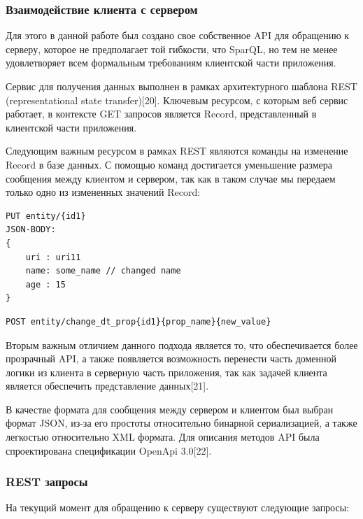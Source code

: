 \documentclass[12pt]{article}
\begin{document}
\subsubsection{Взаимодействие клиента с сервером}
\qquad Для этого в данной работе был создано свое собственное API для обращению к серверу, которое не предполагает той гибкости, что SparQL, но тем не менее удовлетворяет всем формальным требованиям клиентской части приложения.

Сервис для получения данных выполнен в рамках архитектурного шаблона REST (representational state transfer)[20]. Ключевым ресурсом, с которым веб сервис работает, в контексте GET запросов является Record, представленный в клиентской части приложения.

Следующим важным ресурсом в рамках REST являются команды на изменение Record в базе данных. С помощью команд достигается уменьшение размера сообщения между клиентом и сервером, так как в таком случае мы передаем только одно из измененных значений Record:

\begin{lstlisting}[language=XML, caption={Классический CRUD подход}, captionpos=b]
PUT entity/{id1}
JSON-BODY:
{
    uri : uri11
    name: some_name // changed name
    age : 15
}
\end{lstlisting}

\begin{lstlisting}[language=XML, caption={Продвинутый подход}, captionpos=b]
POST entity/change_dt_prop{id1}{prop_name}{new_value}
\end{lstlisting}

Вторым важным отличием данного подхода является то, что обеспечивается более прозрачный API, а также появляется возможность перенести часть доменной логики из клиента в серверную часть приложения, так как задачей клиента является обеспечить представление данных[21].

В качестве формата для сообщения между сервером и клиентом был выбран формат JSON, из-за его простоты относительно бинарной сериализацией, а также легкостью относительно XML формата. Для описания методов API была спроектирована спецификации OpenApi 3.0[22].

\subsubsection{REST запросы}
На текущий момент для обращению к серверу существуют следующие запросы:
\end{document}
